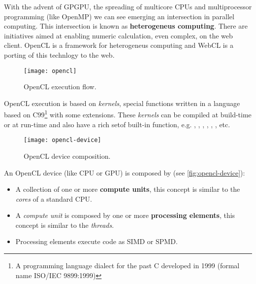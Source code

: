 
With the advent of \ac{GPGPU}, the spreading of multicore CPUs and multiprocessor
programming (like OpenMP) we can see emerging an intersection in parallel computing.
This intersection is known as \textbf{heterogeneus computing}. There are
initiatives aimed at enabling numeric calculation, even complex, on the web client.
\ac{OpenCL} is a framework for heterogeneus computing and \ac{WebCL} is a porting
of this technlogy to the web.\\

\begin{figure}[htb]
    \centering
    \texttt{[image: opencl]}
    \caption{OpenCL execution flow.}
    \label{fig:opencl}
\end{figure}
\ac{OpenCL} execution is based on \emph{kernels}, special functions written in
a language based on C99\footnote{A programming language dialect for the past C
developed in 1999 (formal name ISO/IEC 9899:1999)} with some extensions. These
\emph{kernels} can be compiled at build-time or at run-time and also have a rich
setof built-in function, e.g. , , , ,
, , etc.

\begin{figure}[htb]
    \centering
    \texttt{[image: opencl-device]}
    \caption{OpenCL device composition.}
    \label{fig:opencl-device}
\end{figure}
An \ac{OpenCL} device (like CPU or GPU) is composed by (see
\autoref{fig:opencl-device}):
\begin{itemize}
    \item A collection of one or more \textbf{compute units}, this concept is
    similar to the \emph{cores} of a standard CPU.

    \item A \emph{compute unit} is composed by one or more \textbf{processing
    elements}, this concept is similar to the \emph{threads}.

    \item Processing elements execute code as \ac{SIMD} or \ac{SPMD}.
\end{itemize}

